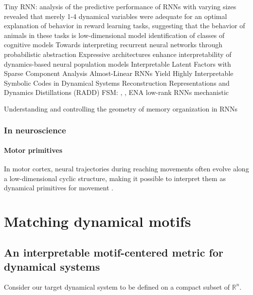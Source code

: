 \documentclass{article}
\theoremstyle{definition} \newtheorem{definition}{Definition}  \newtheorem{example}{Example}
\theoremstyle{remark} \newtheorem{remark}{Remark}
\newcommand{\reals}{\mathbb{R}}
\newcounter{ct}
\begin{document}
Tiny RNN\citep{jian2023tinyrnn}: analysis of the predictive performance of RNNs with varying sizes revealed that merely 1-4 dynamical variables were adequate for an optimal explanation of behavior in reward learning tasks, suggesting that the behavior of animals in these tasks is low-dimensional
model identification of classes of cognitive models\citep{rmus2024artificial}
Towards interpreting recurrent neural networks through probabilistic abstraction \citep{dong2020towards}
Expressive architectures enhance interpretability of dynamics-based neural population models \citep{sedler2023expressive}
Interpretable Latent Factors with Sparse Component Analysis \citep{zimnik2024identifying}
Almost-Linear RNNs Yield Highly Interpretable Symbolic Codes in Dynamical Systems Reconstruction \citep{brenner2024almost}
\citep{he2024multilevel}
\citep{schaeffer2020reverseengineering} Representations and Dynamics Distillations (RADD)
\citep{turner2023simplicity}
FSM: \citep{oliva2019fsm}, \citep{cotteret2024fsm},  ENA \citep{ceni2020interpreting}
low-rank RNNs \citep{beiran2021shaping, valente2022extracting, valente2022probing}
mechanistic \citep{qian2024partial}
\citep{Nassar2018b}

Understanding and controlling the geometry of memory organization in RNNs \citep{haputhanthri2025understanding}

\subsubsection{In neuroscience}
\paragraph{Motor primitives}
In motor cortex, neural trajectories during reaching movements often evolve along a low-dimensional cyclic structure, making it possible to interpret them as dynamical primitives for movement \citep{ijspeert2013dynamical}.

\citep{marton2021efficient}



\section{Matching dynamical motifs}
\subsection{An interpretable motif-centered metric for dynamical systems}\label{sec:aut_motif_metric}
Consider our target dynamical system to be defined on a compact subset of $\reals^n$.
\end{document}
